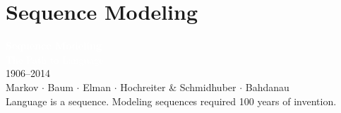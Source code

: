 \section{Sequence Modeling}

{
\begin{frame}[plain]
  \centering
  \vspace{1.8cm}
  \textcolor{white}{\Huge\bfseries Sequence Modeling}\\[0.5em]
  \textcolor{white}{\Large The Path to Language}\\[1em]
  \textcolor{white!80}{\large 1906--2014}\\[1.5em]
  \textcolor{white!60}{\normalsize Markov \(\cdot\) Baum \(\cdot\) Elman
    \(\cdot\) Hochreiter \& Schmidhuber \(\cdot\) Bahdanau}\\[1em]
  \textcolor{white!50}{\small Language is a sequence.
  Modeling sequences required 100 years of invention.}

\end{frame}
}

